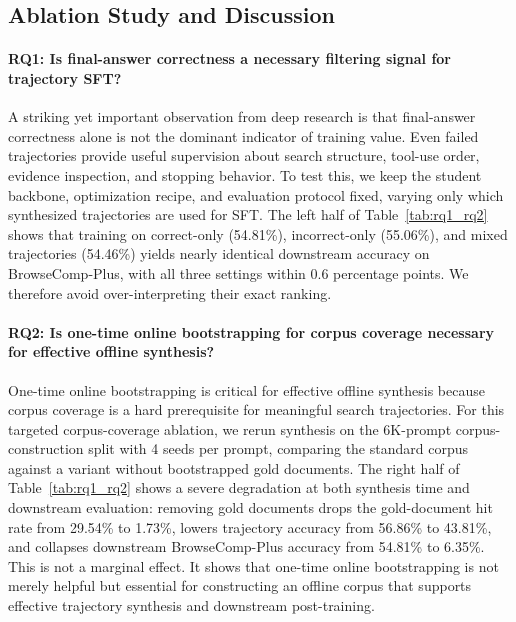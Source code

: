 \subsection{Ablation Study and Discussion}
\label{subsec:ablation}


\paragraph{RQ1: Is final-answer correctness a necessary filtering signal for trajectory SFT?} \label{subsec:ablation_rq1} A striking yet important observation from deep research is that final-answer correctness alone is not the dominant indicator of training value. Even failed trajectories provide useful supervision about search structure, tool-use order, evidence inspection, and stopping behavior. To test this, we keep the student backbone, optimization recipe, and evaluation protocol fixed, varying only which synthesized trajectories are used for SFT. The left half of Table~\ref{tab:rq1_rq2} shows that training on correct-only (54.81\%), incorrect-only (55.06\%), and mixed trajectories (54.46\%) yields nearly identical downstream accuracy on BrowseComp-Plus, with all three settings within 0.6 percentage points. We therefore avoid over-interpreting their exact ranking.

\paragraph{RQ2: Is one-time online bootstrapping for corpus coverage necessary for effective offline synthesis?} \label{subsec:ablation_rq2}
One-time online bootstrapping is critical for effective offline synthesis because corpus coverage is a hard prerequisite for meaningful search trajectories. For this targeted corpus-coverage ablation, we rerun synthesis on the 6K-prompt corpus-construction split with 4 seeds per prompt, comparing the standard corpus against a variant without bootstrapped gold documents. The right half of Table~\ref{tab:rq1_rq2} shows a severe degradation at both synthesis time and downstream evaluation: removing gold documents drops the gold-document hit rate from 29.54\% to 1.73\%, lowers trajectory accuracy from 56.86\% to 43.81\%, and collapses downstream BrowseComp-Plus accuracy from 54.81\% to 6.35\%. This is not a marginal effect. It shows that one-time online bootstrapping is not merely helpful but essential for constructing an offline corpus that supports effective trajectory synthesis and downstream post-training.

